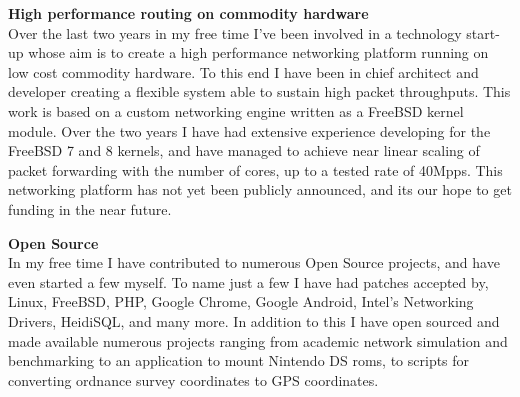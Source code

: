 \documentclass[a4paper,10pt]{article}
\begin{document}
 \textbf{High performance routing on commodity hardware}\\
 Over the last two years in my free time I've been involved in a technology start-up whose aim is to create a high performance networking platform running on low cost commodity hardware. To this end I have been in chief architect and developer creating a flexible system able to sustain high packet throughputs. This work is based on a custom networking engine written as a FreeBSD kernel module. Over the two years I have had extensive experience developing for the FreeBSD 7 and 8 kernels, and have managed to achieve near linear scaling of packet forwarding with the number of cores, up to a tested rate of 40Mpps. This networking platform has not yet been publicly announced, and its our hope to get funding in the near future.

 \textbf{Open Source}\\
 In my free time I have contributed to numerous Open Source projects, and have even started a few myself. To name just a few I have had patches accepted by, Linux, FreeBSD, PHP, Google Chrome, Google Android, Intel's Networking Drivers, HeidiSQL, and many more. In addition to this I have open sourced and made available numerous projects ranging from academic network simulation and benchmarking to an application to mount Nintendo DS roms, to scripts for converting ordnance survey coordinates to GPS coordinates.




\renewcommand\refname{Publications}



\begin{tabular}{rl}

\end{tabular}


\end{document}
